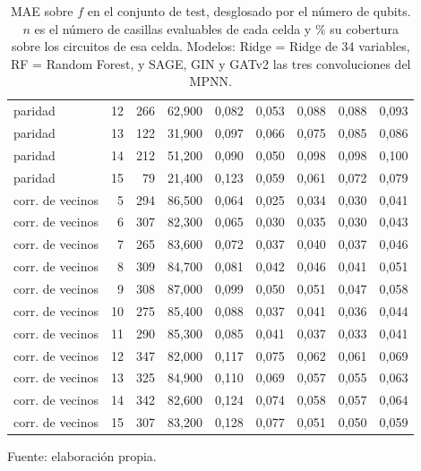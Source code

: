 \begin{table}[htbp]
{\begin{tabular}{@{}lrrrrrrrr@{}}
        paridad & 12 & 266 & 62,900 & 0,082 & 0,053 & 0,088 & 0,088 & 0,093 \\
        paridad & 13 & 122 & 31,900 & 0,097 & 0,066 & 0,075 & 0,085 & 0,086 \\
        paridad & 14 & 212 & 51,200 & 0,090 & 0,050 & 0,098 & 0,098 & 0,100 \\
        paridad & 15 & 79 & 21,400 & 0,123 & 0,059 & 0,061 & 0,072 & 0,079 \\
        corr. de vecinos & 5 & 294 & 86,500 & 0,064 & 0,025 & 0,034 & 0,030 & 0,041 \\
        corr. de vecinos & 6 & 307 & 82,300 & 0,065 & 0,030 & 0,035 & 0,030 & 0,043 \\
        corr. de vecinos & 7 & 265 & 83,600 & 0,072 & 0,037 & 0,040 & 0,037 & 0,046 \\
        corr. de vecinos & 8 & 309 & 84,700 & 0,081 & 0,042 & 0,046 & 0,041 & 0,051 \\
        corr. de vecinos & 9 & 308 & 87,000 & 0,099 & 0,050 & 0,051 & 0,047 & 0,058 \\
        corr. de vecinos & 10 & 275 & 85,400 & 0,088 & 0,037 & 0,041 & 0,036 & 0,044 \\
        corr. de vecinos & 11 & 290 & 85,300 & 0,085 & 0,041 & 0,037 & 0,033 & 0,041 \\
        corr. de vecinos & 12 & 347 & 82,000 & 0,117 & 0,075 & 0,062 & 0,061 & 0,069 \\
        corr. de vecinos & 13 & 325 & 84,900 & 0,110 & 0,069 & 0,057 & 0,055 & 0,063 \\
        corr. de vecinos & 14 & 342 & 82,600 & 0,124 & 0,074 & 0,058 & 0,057 & 0,064 \\
        corr. de vecinos & 15 & 307 & 83,200 & 0,128 & 0,077 & 0,051 & 0,050 & 0,059 \\
        \bottomrule
    \end{tabular}}

    \caption{MAE sobre $f$ en el conjunto de test, desglosado por el número de qubits. $n$ es el número de casillas evaluables de cada celda y \% su cobertura sobre los circuitos de esa celda. Modelos: Ridge = Ridge de 34 variables, RF = Random Forest, y SAGE, GIN y GATv2 las tres convoluciones del MPNN.}
    \label{tab:v2_tamano_mae_f}

    {\footnotesize Fuente: elaboración propia.}
\end{table}
